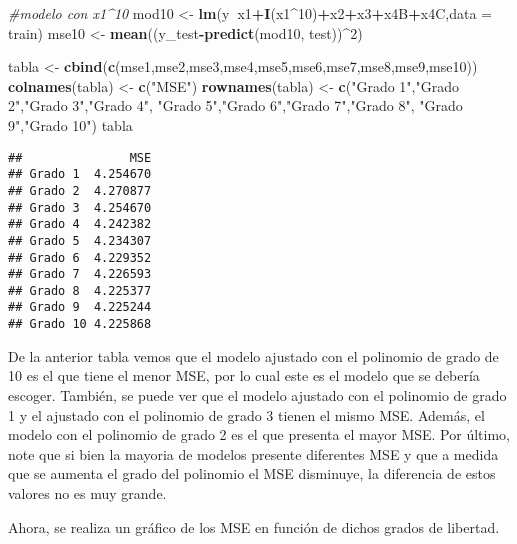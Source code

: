 \documentclass[
]{article}
\newenvironment{Shaded}{\begin{snugshade}}{\end{snugshade}}
\newcommand{\CommentTok}[1]{\textcolor[rgb]{0.56,0.35,0.01}{\textit{#1}}}
\newcommand{\DataTypeTok}[1]{\textcolor[rgb]{0.13,0.29,0.53}{#1}}
\newcommand{\DecValTok}[1]{\textcolor[rgb]{0.00,0.00,0.81}{#1}}
\newcommand{\KeywordTok}[1]{\textcolor[rgb]{0.13,0.29,0.53}{\textbf{#1}}}
\newcommand{\NormalTok}[1]{#1}
\newcommand{\OperatorTok}[1]{\textcolor[rgb]{0.81,0.36,0.00}{\textbf{#1}}}
\newcommand{\StringTok}[1]{\textcolor[rgb]{0.31,0.60,0.02}{#1}}
\begin{document}
\begin{Shaded}
\begin{Highlighting}[]
\CommentTok{#modelo con x1^10}
\NormalTok{mod10 <-}\StringTok{ }\KeywordTok{lm}\NormalTok{(y}\OperatorTok{~}\NormalTok{x1}\OperatorTok{+}\KeywordTok{I}\NormalTok{(x1}\OperatorTok{^}\DecValTok{10}\NormalTok{)}\OperatorTok{+}\NormalTok{x2}\OperatorTok{+}\NormalTok{x3}\OperatorTok{+}\NormalTok{x4B}\OperatorTok{+}\NormalTok{x4C,}\DataTypeTok{data =}\NormalTok{ train)}
\NormalTok{mse10 <-}\StringTok{ }\KeywordTok{mean}\NormalTok{((y_test}\OperatorTok{-}\KeywordTok{predict}\NormalTok{(mod10, test))}\OperatorTok{^}\DecValTok{2}\NormalTok{)}

\NormalTok{tabla <-}\StringTok{ }\KeywordTok{cbind}\NormalTok{(}\KeywordTok{c}\NormalTok{(mse1,mse2,mse3,mse4,mse5,mse6,mse7,mse8,mse9,mse10))}
\KeywordTok{colnames}\NormalTok{(tabla) <-}\StringTok{ }\KeywordTok{c}\NormalTok{(}\StringTok{"MSE"}\NormalTok{)}
\KeywordTok{rownames}\NormalTok{(tabla) <-}\StringTok{ }\KeywordTok{c}\NormalTok{(}\StringTok{"Grado 1"}\NormalTok{,}\StringTok{"Grado 2"}\NormalTok{,}\StringTok{"Grado 3"}\NormalTok{,}\StringTok{"Grado 4"}\NormalTok{,}
                     \StringTok{"Grado 5"}\NormalTok{,}\StringTok{"Grado 6"}\NormalTok{,}\StringTok{"Grado 7"}\NormalTok{,}\StringTok{"Grado 8"}\NormalTok{,}
                     \StringTok{"Grado 9"}\NormalTok{,}\StringTok{"Grado 10"}\NormalTok{)}
\NormalTok{tabla}
\end{Highlighting}
\end{Shaded}

\begin{verbatim}
##               MSE
## Grado 1  4.254670
## Grado 2  4.270877
## Grado 3  4.254670
## Grado 4  4.242382
## Grado 5  4.234307
## Grado 6  4.229352
## Grado 7  4.226593
## Grado 8  4.225377
## Grado 9  4.225244
## Grado 10 4.225868
\end{verbatim}

De la anterior tabla vemos que el modelo ajustado con el polinomio de
grado de 10 es el que tiene el menor MSE, por lo cual este es el modelo
que se debería escoger. También, se puede ver que el modelo ajustado con
el polinomio de grado 1 y el ajustado con el polinomio de grado 3 tienen
el mismo MSE. Además, el modelo con el polinomio de grado 2 es el que
presenta el mayor MSE. Por último, note que si bien la mayoria de
modelos presente diferentes MSE y que a medida que se aumenta el grado
del polinomio el MSE disminuye, la diferencia de estos valores no es muy
grande.

Ahora, se realiza un gráfico de los MSE en función de dichos grados de
libertad.
\end{document}
